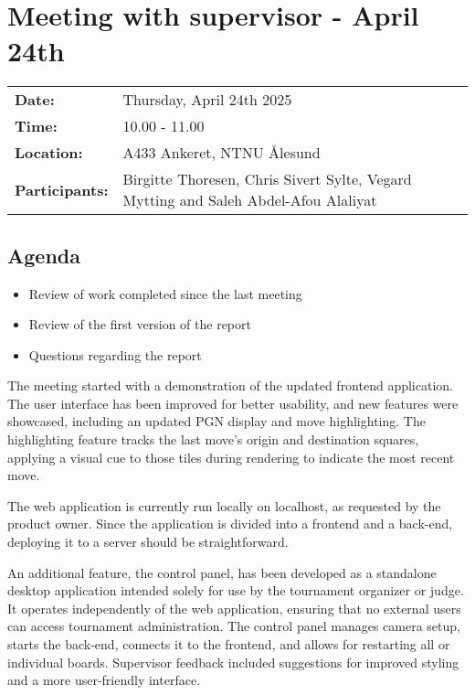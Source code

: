 \section{Meeting with supervisor - April 24th}
\begin{tabular}{ll}
    \textbf{Date:} & Thursday, April 24th 2025 \\
    \textbf{Time:} & 10.00 - 11.00\\
    \textbf{Location:} & A433 Ankeret, NTNU Ålesund \\
    \textbf{Participants:} & Birgitte Thoresen, Chris Sivert Sylte, Vegard Mytting and Saleh Abdel-Afou Alaliyat\\
\end{tabular}

\vspace{0.5cm}

\subsection{Agenda}

\begin{itemize} 
    \item Review of work completed since the last meeting
    \item Review of the first version of the report
    \item Questions regarding the report
\end{itemize}

The meeting started with a demonstration of the updated frontend application. The user interface has been improved for better usability, and new features were showcased, including an updated PGN display and move highlighting. The highlighting feature tracks the last move’s origin and destination squares, applying a visual cue to those tiles during rendering to indicate the most recent move.

The web application is currently run locally on localhost, as requested by the product owner. Since the application is divided into a frontend and a back-end, deploying it to a server should be straightforward.

An additional feature, the control panel, has been developed as a standalone desktop application intended solely for use by the tournament organizer or judge. It operates independently of the web application, ensuring that no external users can access tournament administration. The control panel manages camera setup, starts the back-end, connects it to the frontend, and allows for restarting all or individual boards. Supervisor feedback included suggestions for improved styling and a more user-friendly interface.

